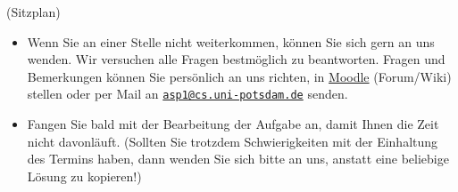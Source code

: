 \documentclass[a4paper,12pt,ngerman]{article}
\begin{document}
\begin{PraktikumsAufgabe}{2}{(Sitzplan)}
\begin{itemize}
\item Wenn Sie an einer Stelle nicht weiterkommen, können Sie sich gern an uns wenden.
      Wir versuchen alle Fragen bestmöglich zu beantworten.
      Fragen und Bemerkungen k\"onnen Sie pers\"onlich an uns richten,
      in \href{http://moodle.cs.uni-potsdam.de/course/view.php?id=39}{Moodle} (Forum/Wiki) stellen oder per Mail an
      \href{mailto:asp1@cs.uni-potsdam.de}{\texttt{asp1@cs.uni-potsdam.de}} senden.
\item Fangen Sie bald mit der Bearbeitung der Aufgabe an, damit Ihnen die Zeit nicht davonläuft.
      (Sollten Sie trotzdem Schwierigkeiten mit der Einhaltung des Termins
       haben, dann wenden Sie sich bitte an uns, anstatt eine beliebige Lösung
       zu kopieren!)
\end{itemize}

\end{PraktikumsAufgabe}
\end{document}
